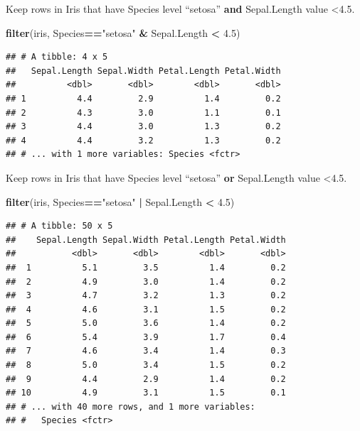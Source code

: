 \documentclass[]{book}
\newenvironment{Shaded}{\begin{snugshade}}{\end{snugshade}}
\newcommand{\KeywordTok}[1]{\textcolor[rgb]{0.13,0.29,0.53}{\textbf{#1}}}
\newcommand{\FloatTok}[1]{\textcolor[rgb]{0.00,0.00,0.81}{#1}}
\newcommand{\StringTok}[1]{\textcolor[rgb]{0.31,0.60,0.02}{#1}}
\newcommand{\OperatorTok}[1]{\textcolor[rgb]{0.81,0.36,0.00}{\textbf{#1}}}
\newcommand{\NormalTok}[1]{#1}
\begin{document}
Keep rows in Iris that have Species level ``setosa'' \textbf{and}
Sepal.Length value \textless{}4.5.

\begin{Shaded}
\begin{Highlighting}[]
\KeywordTok{filter}\NormalTok{(iris, Species}\OperatorTok{==}\StringTok{"setosa"} \OperatorTok{&}\StringTok{ }\NormalTok{Sepal.Length }\OperatorTok{<}\StringTok{ }\FloatTok{4.5}\NormalTok{)}
\end{Highlighting}
\end{Shaded}

\begin{verbatim}
## # A tibble: 4 x 5
##   Sepal.Length Sepal.Width Petal.Length Petal.Width
##          <dbl>       <dbl>        <dbl>       <dbl>
## 1          4.4         2.9          1.4         0.2
## 2          4.3         3.0          1.1         0.1
## 3          4.4         3.0          1.3         0.2
## 4          4.4         3.2          1.3         0.2
## # ... with 1 more variables: Species <fctr>
\end{verbatim}

Keep rows in Iris that have Species level ``setosa'' \textbf{or}
Sepal.Length value \textless{}4.5.

\begin{Shaded}
\begin{Highlighting}[]
\KeywordTok{filter}\NormalTok{(iris, Species}\OperatorTok{==}\StringTok{"setosa"} \OperatorTok{|}\StringTok{ }\NormalTok{Sepal.Length }\OperatorTok{<}\StringTok{ }\FloatTok{4.5}\NormalTok{)}
\end{Highlighting}
\end{Shaded}

\begin{verbatim}
## # A tibble: 50 x 5
##    Sepal.Length Sepal.Width Petal.Length Petal.Width
##           <dbl>       <dbl>        <dbl>       <dbl>
##  1          5.1         3.5          1.4         0.2
##  2          4.9         3.0          1.4         0.2
##  3          4.7         3.2          1.3         0.2
##  4          4.6         3.1          1.5         0.2
##  5          5.0         3.6          1.4         0.2
##  6          5.4         3.9          1.7         0.4
##  7          4.6         3.4          1.4         0.3
##  8          5.0         3.4          1.5         0.2
##  9          4.4         2.9          1.4         0.2
## 10          4.9         3.1          1.5         0.1
## # ... with 40 more rows, and 1 more variables:
## #   Species <fctr>
\end{verbatim}
\end{document}
